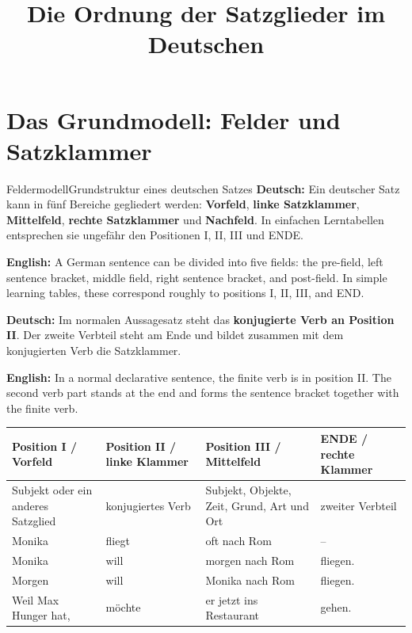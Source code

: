 \documentclass[a4paper,11pt]{article}
\title{Die Ordnung der Satzglieder im Deutschen}
\author{}
\date{}
\newcommand{\GermanText}[1]{\textbf{Deutsch: }#1\par}
\newcommand{\EnglishText}[1]{{\small\color{SoftGray}\textbf{English: }#1\par}}
\newcommand{\TableHeader}[1]{\color{white}\textbf{#1}}
\begin{document}
    \maketitle
    \tableofcontents
    \newpage
    
    
    \section{Das Grundmodell: Felder und Satzklammer}
        
        \begin{grammarentry}{Feldermodell}{Grundstruktur eines deutschen Satzes}
            \GermanText{Ein deutscher Satz kann in fünf Bereiche gegliedert werden: \textbf{Vorfeld}, \textbf{linke Satzklammer}, \textbf{Mittelfeld}, \textbf{rechte Satzklammer} und \textbf{Nachfeld}. In einfachen Lerntabellen entsprechen sie ungefähr den Positionen I, II, III und ENDE.}
            \EnglishText{A German sentence can be divided into five fields: the pre-field, left sentence bracket, middle field, right sentence bracket, and post-field. In simple learning tables, these correspond roughly to positions I, II, III, and END.}
            
            \GermanText{Im normalen Aussagesatz steht das \textbf{konjugierte Verb an Position II}. Der zweite Verbteil steht am Ende und bildet zusammen mit dem konjugierten Verb die Satzklammer.}
            \EnglishText{In a normal declarative sentence, the finite verb is in position II. The second verb part stands at the end and forms the sentence bracket together with the finite verb.}
        \end{grammarentry}
        
        \begin{longtable}{|p{2.4cm}|p{3.1cm}|p{5.7cm}|p{3.0cm}|}
            \hline
            \rowcolor{HeaderBlueDark}
            \TableHeader{Position I / Vorfeld} &
            \TableHeader{Position II / linke Klammer} &
            \TableHeader{Position III / Mittelfeld} &
            \TableHeader{ENDE / rechte Klammer} \\
            \hline
            Subjekt oder ein anderes Satzglied & konjugiertes Verb & Subjekt, Objekte, Zeit, Grund, Art und Ort & zweiter Verbteil \\
            \hline
            Monika & fliegt & oft nach Rom & -- \\
            \hline
            Monika & will & morgen nach Rom & fliegen. \\
            \hline
            Morgen & will & Monika nach Rom & fliegen. \\
            \hline
            Weil Max Hunger hat, & möchte & er jetzt ins Restaurant & gehen. \\
            \hline
        \end{longtable}
        
\end{document}
